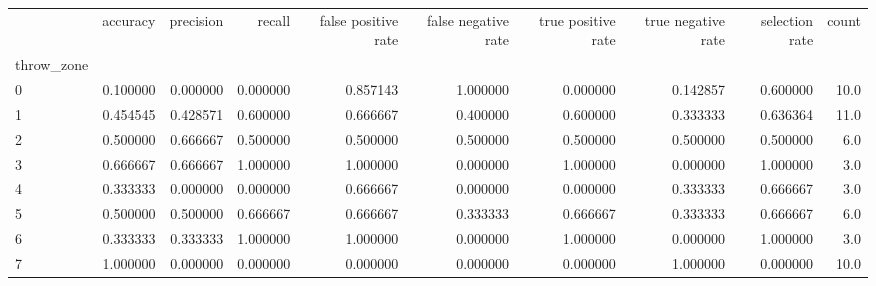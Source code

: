 \begin{tabular}{lrrrrrrrrr}
\toprule
{} &  accuracy &  precision &    recall &  false positive rate &  false negative rate &  true positive rate &  true negative rate &  selection rate &  count \\
throw\_zone &           &            &           &                      &                      &                     &                     &                 &        \\
\midrule
0          &  0.100000 &   0.000000 &  0.000000 &             0.857143 &             1.000000 &            0.000000 &            0.142857 &        0.600000 &   10.0 \\
1          &  0.454545 &   0.428571 &  0.600000 &             0.666667 &             0.400000 &            0.600000 &            0.333333 &        0.636364 &   11.0 \\
2          &  0.500000 &   0.666667 &  0.500000 &             0.500000 &             0.500000 &            0.500000 &            0.500000 &        0.500000 &    6.0 \\
3          &  0.666667 &   0.666667 &  1.000000 &             1.000000 &             0.000000 &            1.000000 &            0.000000 &        1.000000 &    3.0 \\
4          &  0.333333 &   0.000000 &  0.000000 &             0.666667 &             0.000000 &            0.000000 &            0.333333 &        0.666667 &    3.0 \\
5          &  0.500000 &   0.500000 &  0.666667 &             0.666667 &             0.333333 &            0.666667 &            0.333333 &        0.666667 &    6.0 \\
6          &  0.333333 &   0.333333 &  1.000000 &             1.000000 &             0.000000 &            1.000000 &            0.000000 &        1.000000 &    3.0 \\
7          &  1.000000 &   0.000000 &  0.000000 &             0.000000 &             0.000000 &            0.000000 &            1.000000 &        0.000000 &   10.0 \\
\bottomrule
\end{tabular}
